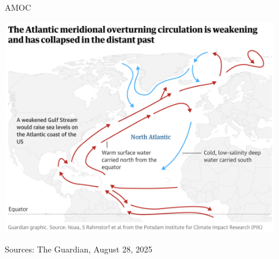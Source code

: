 \documentclass[12pt]{beamer}
\begin{document}
\begin{frame}{AMOC}

\begin{center}
\includegraphics[width=0.9\textwidth]{images/guardian_2025-08_collapse-amoc.png}
\end{center}
%


\vfill
{\tiny Sources: The Guardian, August 28, 2025}
\end{frame}


\end{document}
